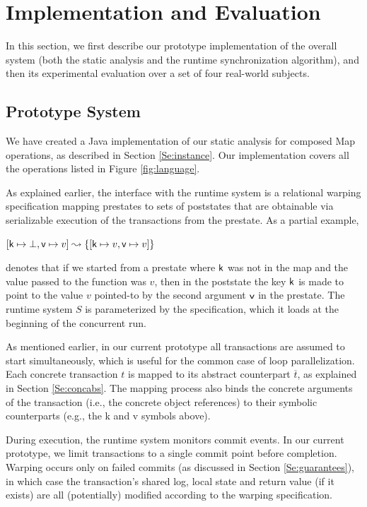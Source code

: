 \section{Implementation and Evaluation}\label{Se:experiments}

In this section, we first describe our prototype implementation of the overall system (both the static analysis and the runtime synchronization algorithm), and then its experimental evaluation over a set of four real-world subjects. 

\subsection{Prototype System}
\label{Se:system}

We have created a Java implementation of our static analysis for composed {\sf Map} operations, as described  in Section \ref{Se:instance}. Our implementation covers all the operations listed in Figure \ref{fig:language}.  

As explained earlier, the interface with the runtime system is a relational warping specification mapping prestates to sets of poststates that are obtainable via serializable execution of the transactions from the prestate. As a partial example, 
\begin{center}
$[ {\sf k} \mapsto \bot , {\sf v} \mapsto v ] \leadsto \{ [ {\sf k} \mapsto v , {\sf v} \mapsto v ] \}$
\end{center}
denotes that if we started from a prestate where ${\sf k}$ was not in the map and the value passed to the function was $v$, then in the poststate the key ${\sf k}$ is made to point to the value $v$ pointed-to by the second argument ${\sf v}$ in the prestate.
%
The runtime system $S$ is parameterized by the specification, which it loads at the beginning of the concurrent run. 

As mentioned earlier, in our current prototype all transactions are assumed to start simultaneously, which is useful for the common case of loop parallelization. Each concrete transaction $t$ is mapped to its abstract counterpart $\overline{t}$, as explained in Section \ref{Se:concabs}. The mapping process also binds the concrete arguments of the transaction (i.e., the concrete object references) to their symbolic counterparts (e.g., the {\sf k} and {\sf v} symbols above). 

During execution, the runtime system monitors commit events. In our current prototype, we limit transactions to a single commit point before completion. Warping occurs only on failed commits (as discussed in Section \ref{Se:guarantees}), in which case the transaction's shared log, local state and return value (if it exists) are all (potentially) modified according to the warping specification. 

